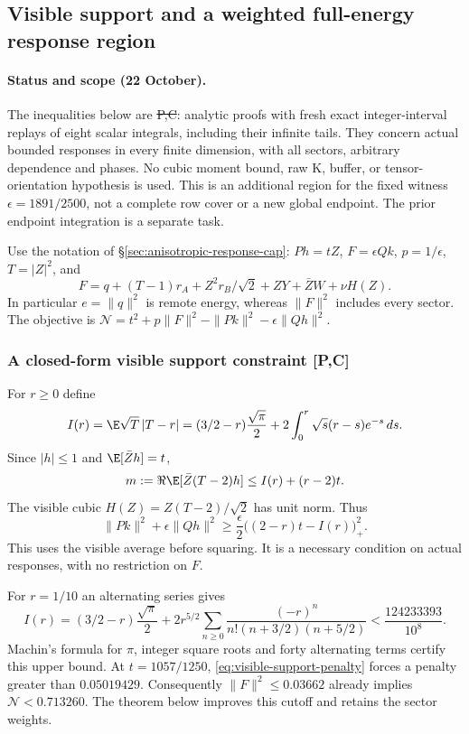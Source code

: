 \subsection{Visible support and a weighted full-energy response region}
\label{sec:weighted-full-energy-response}
\paragraph{Status and scope (22 October).}
The inequalities below are \st{P,C}: analytic proofs with fresh exact
integer-interval replays of eight scalar integrals, including their infinite
tails. They concern actual bounded responses in every finite dimension,
with all sectors, arbitrary dependence and phases. No cubic moment bound,
raw K, buffer, or tensor-orientation hypothesis is used. This is an
additional region for the fixed witness $\epsilon=1891/2500$, not a
complete row cover or a new global endpoint. The prior endpoint integration
is a separate task.

Use the notation of \S\ref{sec:anisotropic-response-cap}: $Ph=tZ$,
$F=\epsilon Qk$, $p=1/\epsilon$, $T=|Z|^2$, and
\[
 F=q+(T-1)r_A+Z^2r_B/\sqrt2+ZY+\bar ZW+\nu H(Z).
\]
In particular $e=\|q\|^2$ is remote energy, whereas $\|F\|^2$ includes
every sector. The objective is
$\mathcal N=t^2+p\|F\|^2-\|Pk\|^2-\epsilon\|Qh\|^2$.

\subsubsection{A closed-form visible support constraint [P,C]}
For $r\ge0$ define
\[
 I(r)=\E\sqrt T\,|T-r|
 =(3/2-r)\frac{\sqrt\pi}{2}
       +2\int_0^r\sqrt s(r-s)e^{-s}\,ds.
\]
Since $|h|\le1$ and $\E[\bar Zh]=t$,
\[
 m:=\Re\E[\bar Z(T-2)h]
 \le I(r)+(r-2)t.
\]
The visible cubic $H(Z)=Z(T-2)/\sqrt2$ has unit norm. Thus
\begin{equation}\label{eq:visible-support-penalty}
 \boxed{\quad
 \|Pk\|^2+\epsilon\|Qh\|^2
 \ge\frac\epsilon2\bigl((2-r)t-I(r)\bigr)_+^2.
 \quad}
\end{equation}
This uses the visible average before squaring. It is a necessary condition
on actual responses, with no restriction on $F$.

For $r=1/10$ an alternating series gives
\[
 I(r)=(3/2-r)\frac{\sqrt\pi}{2}
 +2r^{5/2}\sum_{n\ge0}
 \frac{(-r)^n}{n!(n+3/2)(n+5/2)}
 <\frac{124233393}{10^8}.
\]
Machin's formula for $\pi$, integer square roots and forty alternating
terms certify this upper bound. At $t=1057/1250$,
\eqref{eq:visible-support-penalty} forces a penalty greater than
$0.05019429$. Consequently $\|F\|^2\le0.03662$ already implies
$\mathcal N<0.713260$. The theorem below improves this cutoff and
retains the sector weights.

